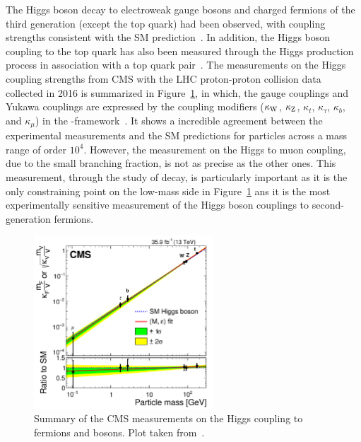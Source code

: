 The Higgs boson decay to electroweak gauge bosons and charged fermions of the third generation (except the top quark) had been observed, 
with coupling strengths consistent with the SM prediction~\cite{Sirunyan:2312121, 201996, Sirunyan:2017exp, PhysRevLett.121.121801, 2018283, PhysRevD.99.072001, 201859, 2019508, Aaboud_2018}.
In addition, the Higgs boson coupling to the top quark has also been measured through the Higgs production process in association with a top quark pair~\cite{PhysRevLett.120.231801, 2018173}.
The measurements on the Higgs coupling strengths from CMS with the LHC proton-proton collision data collected in 2016 is summarized in Figure~\ref{fig:higgs_2016},
in which, the gauge couplings and Yukawa couplings are expressed by the coupling modifiers 
($\kappa_{\mathrm{W}}$, $\kappa_{\mathrm{Z}}$, $\kappa_{t}$, $\kappa_{\tau}$, $\kappa_{b}$, and $\kappa_{\mu}$) in the \kappa-framework~\cite{Heinemeyer:2013tqa}.
It shows a incredible agreement between the experimental measurements and the SM predictions for particles across a mass range of order $10^{4}$.
However, the measurement on the Higgs to muon coupling, due to the small branching fraction, is not as precise as the other ones.
This measurement, through the study of \hmm decay, is particularly important 
as it is the only constraining point on the low-mass side in Figure~\ref{fig:higgs_2016}
ans it is the most experimentally sensitive measurement of the Higgs boson couplings to second-generation fermions.


\begin{figure}[!htb]
    \centering
    \captionsetup{justification=justified}
    \includegraphics[width=0.60\textwidth]{pics/Intro/higgs_coupling_2016.png}
    \caption{Summary of the CMS measurements on the Higgs coupling to fermions and bosons.
             Plot taken from~\cite{Sirunyan:2640611}. }
    \label{fig:higgs_2016}
\end{figure}



